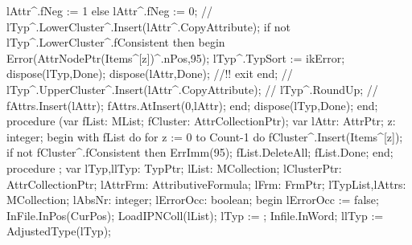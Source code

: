                lAttr^.fNeg := 1
            else lAttr^.fNeg := 0;
         //  lTyp^.LowerCluster^.Insert(lAttr^.CopyAttribute);
         if not lTyp^.LowerCluster^.fConsistent then
         begin
            Error(AttrNodePtr(Items^[z])^.nPos,95);
            lTyp^.TypSort := ikError;
            dispose(lTyp,Done);
            dispose(lAttr,Done); //!!
            exit
         end;
         //  lTyp^.UpperCluster^.Insert(lAttr^.CopyAttribute);
         //  lTyp^.RoundUp;
         //  fAttrs.Insert(lAttr);
         fAttrs.AtInsert(0,lAttr);
      end;
   dispose(lTyp,Done);
end;
\eatline
{}\nwendcode{}\nwdocspar
\nwenddocs{}\endmoddef\nwstartdeflinemarkup{}\nwenddeflinemarkup
procedure (var fList: MList; fCluster: AttrCollectionPtr);
var
   lAttr: AttrPtr;
   z: integer;
begin
   with fList do
      for z := 0 to Count-1 do
         fCluster^.Insert(Items^[z]);
   if not fCluster^.fConsistent then ErrImm(95);
   fList.DeleteAll;
   fList.Done;
end;
\eatline
{}\nwendcode{}\nwdocspar
\nwenddocs{}\endmoddef\nwstartdeflinemarkup{}\nwenddeflinemarkup
procedure ;
var
   lTyp,llTyp: TypPtr;
   lList: MCollection;
   lClusterPtr: AttrCollectionPtr;
   lAttrFrm: AttributiveFormula;
   lFrm: FrmPtr;
   lTypList,lAttrs: MCollection;
   lAbsNr: integer;
   lErrorOcc: boolean;
begin
   lErrorOcc := false;
   InFile.InPos(CurPos);
   LoadIPNColl(lList);
   lTyp := ;
   Infile.InWord;
   llTyp := AdjustedType(lTyp);
